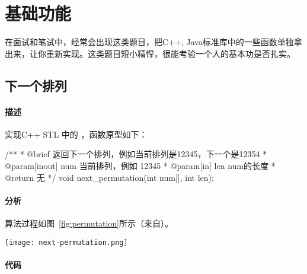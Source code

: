 \chapter{基础功能}
在面试和笔试中，经常会出现这类题目，把C++, Java标准库中的一些函数单独拿出来，让你重新实现。这类题目短小精悍，很能考验一个人的基本功是否扎实。

\section{下一个排列} %
\label{sec:nextpermutation}

\subsubsection{描述}
实现C++ STL 中的 ，函数原型如下：

\begin{Code}
/**
 * @brief 返回下一个排列，例如当前排列是12345，下一个是12354
 * @param[inout] num 当前排列，例如 12345
 * @param[in] len num的长度
 * @return 无
 */
void next_permutation(int num[], int len);
\end{Code}

\subsubsection{分析}
算法过程如图~\ref{fig:permutation}所示（来自）。

\begin{center}
\texttt{[image: next-permutation.png]}\\
\label{fig:permutation}
\end{center}

\subsubsection{代码}

